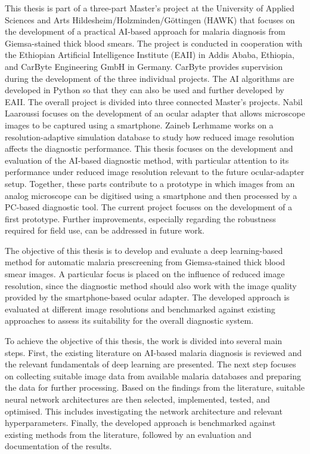 This thesis is part of a three-part Master's project at the University of Applied Sciences and Arts Hildesheim/Holzminden/Göttingen (HAWK) that focuses on the development of a practical AI-based approach for malaria diagnosis from Giemsa-stained thick blood smears. The project is conducted in cooperation with the Ethiopian Artificial Intelligence Institute (EAII) in Addis Ababa, Ethiopia, and CarByte Engineering GmbH in Germany. CarByte provides supervision during the development of the three individual projects. The AI algorithms are developed in Python so that they can also be used and further developed by EAII.
The overall project is divided into three connected Master's projects. Nabil Laaroussi focuses on the development of an ocular adapter that allows microscope images to be captured using a smartphone. Zaineb Lerhmame works on a resolution-adaptive simulation database to study how reduced image resolution affects the diagnostic performance. This thesis focuses on the development and evaluation of the AI-based diagnostic method, with particular attention to its performance under reduced image resolution relevant to the future ocular-adapter setup. Together, these parts contribute to a prototype in which images from an analog microscope can be digitised using a smartphone and then processed by a PC-based diagnostic tool. The current project focuses on the development of a first prototype. Further improvements, especially regarding the robustness required for field use, can be addressed in future work.

The objective of this thesis is to develop and evaluate a deep learning-based method for automatic malaria prescreening from Giemsa-stained thick blood smear images. A particular focus is placed on the influence of reduced image resolution, since the diagnostic method should also work with the image quality provided by the smartphone-based ocular adapter. The developed approach is evaluated at different image resolutions and benchmarked against existing approaches to assess its suitability for the overall diagnostic system.

To achieve the objective of this thesis, the work is divided into several main steps. First, the existing literature on AI-based malaria diagnosis is reviewed and the relevant fundamentals of deep learning are presented. The next step focuses on collecting suitable image data from available malaria databases and preparing the data for further processing. Based on the findings from the literature, suitable neural network architectures are then selected, implemented, tested, and optimised. This includes investigating the network architecture and relevant hyperparameters. Finally, the developed approach is benchmarked against existing methods from the literature, followed by an evaluation and documentation of the results.

